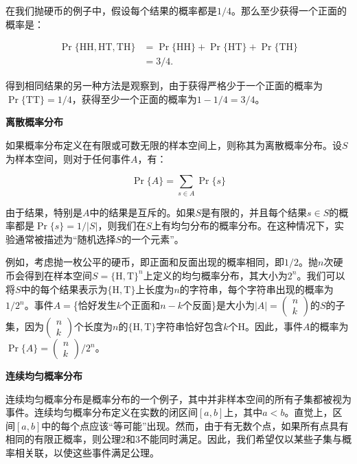 \documentclass[lang=cn,newtx,10pt,scheme=chinese]{elegantbook}
\begin{document}
在我们抛硬币的例子中，假设每个结果的概率都是$1/4$。那么至少获得一个正面的概率是：

$$
\begin{aligned}
\operatorname{Pr}\{\mathrm{HH}, \mathrm{HT}, \mathrm{TH}\} & =\operatorname{Pr}\{\mathrm{HH}\}+\operatorname{Pr}\{\mathrm{HT}\}+\operatorname{Pr}\{\mathrm{TH}\} \\
& =3 / 4 .
\end{aligned}
$$

得到相同结果的另一种方法是观察到，由于获得严格少于一个正面的概率为$\operatorname{Pr}\{\mathrm{TT}\}=1/4$，获得至少一个正面的概率为$1-1/4=3/4$。

\textbf{离散概率分布}

如果概率分布定义在有限或可数无限的样本空间上，则称其为离散概率分布。设$S$为样本空间，则对于任何事件$A$，有：

$$
\operatorname{Pr}\{A\}=\sum_{s \in A} \operatorname{Pr}\{s\}
$$

由于结果，特别是$A$中的结果是互斥的。如果$S$是有限的，并且每个结果$s \in S$的概率都是$\operatorname{Pr}\{s\}=1/|S|$，则我们在$S$上有均匀分布的概率分布。在这种情况下，实验通常被描述为“随机选择$S$的一个元素”。

例如，考虑抛一枚公平的硬币，即正面和反面出现的概率相同，即$1/2$。抛$n$次硬币会得到在样本空间$S=\{\mathrm{H}, \mathrm{T}\}^n$上定义的均匀概率分布，其大小为$2^n$。我们可以将$S$中的每个结果表示为$\{\mathrm{H}, \mathrm{T}\}$上长度为$n$的字符串，每个字符串出现的概率为$1/2^n$。事件$A=$\{恰好发生$k$个正面和$n-k$个反面\}是大小为$|A|=(\begin{array}{l}n \\ k\end{array})$的$S$的子集，因为$(\begin{array}{l}n \\ k\end{array})$个长度为$n$的$\{\mathrm{H}, \mathrm{T}\}$字符串恰好包含$k$个H。因此，事件$A$的概率为$\operatorname{Pr}\{A\}=(\begin{array}{l}n \\ k\end{array})/2^n$。

\textbf{连续均匀概率分布}

连续均匀概率分布是概率分布的一个例子，其中并非样本空间的所有子集都被视为事件。连续均匀概率分布定义在实数的闭区间$[a, b]$上，其中$a<b$。直觉上，区间$[a, b]$中的每个点应该“等可能”出现。然而，由于有无数个点，如果所有点具有相同的有限正概率，则公理2和3不能同时满足。因此，我们希望仅以某些子集与概率相关联，以使这些事件满足公理。
\end{document}
